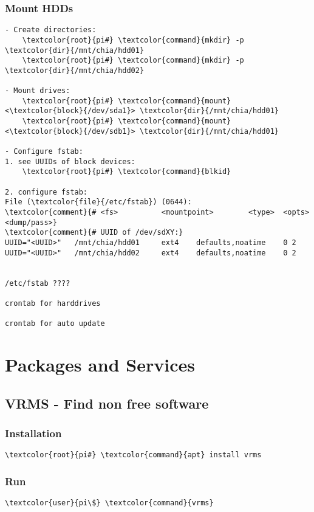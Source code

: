 \documentclass[10pt, a4paper, onecolumn, openany]{book} %
\begin{document}
\subsection{Mount HDDs}
\begin{Verbatim}[commandchars=\\\{\}]
- Create directories:
    \textcolor{root}{pi#} \textcolor{command}{mkdir} -p \textcolor{dir}{/mnt/chia/hdd01}
    \textcolor{root}{pi#} \textcolor{command}{mkdir} -p \textcolor{dir}{/mnt/chia/hdd02}

- Mount drives:
    \textcolor{root}{pi#} \textcolor{command}{mount} <\textcolor{block}{/dev/sda1}> \textcolor{dir}{/mnt/chia/hdd01}
    \textcolor{root}{pi#} \textcolor{command}{mount} <\textcolor{block}{/dev/sdb1}> \textcolor{dir}{/mnt/chia/hdd01}

- Configure fstab:
1. see UUIDs of block devices:
    \textcolor{root}{pi#} \textcolor{command}{blkid}

2. configure fstab:
File (\textcolor{file}{/etc/fstab}) (0644):
\textcolor{comment}{# <fs>          <mountpoint>        <type>  <opts>      <dump/pass>}
\textcolor{comment}{# UUID of /dev/sdXY:}
UUID="<UUID>"   /mnt/chia/hdd01     ext4    defaults,noatime    0 2
UUID="<UUID>"   /mnt/chia/hdd02     ext4    defaults,noatime    0 2


/etc/fstab ????

crontab for harddrives

crontab for auto update

\end{Verbatim}





\chapter{Packages and Services}
\section{VRMS - Find non free software}
\subsection{Installation}
\begin{Verbatim}[commandchars=\\\{\}]
    \textcolor{root}{pi#} \textcolor{command}{apt} install vrms
\end{Verbatim}
\subsection{Run}
\begin{Verbatim}[commandchars=\\\{\}]
    \textcolor{user}{pi\$} \textcolor{command}{vrms}
\end{Verbatim}
\end{document}
